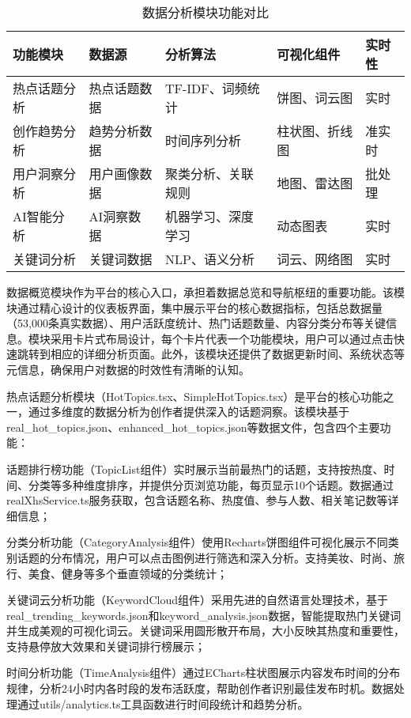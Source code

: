 \documentclass[12pt,a4paper]{article}
\begin{document}
\begin{table}[H]
\centering
\caption{数据分析模块功能对比}
\begin{tabular}{|p{2.2cm}|p{2.2cm}|p{2.8cm}|p{2.2cm}|p{1.8cm}|}
\hline
\textbf{功能模块} & \textbf{数据源} & \textbf{分析算法} & \textbf{可视化组件} & \textbf{实时性} \\
\hline
热点话题分析 & 热点话题数据 & TF-IDF、词频统计 & 饼图、词云图 & 实时 \\
\hline
创作趋势分析 & 趋势分析数据 & 时间序列分析 & 柱状图、折线图 & 准实时 \\
\hline
用户洞察分析 & 用户画像数据 & 聚类分析、关联规则 & 地图、雷达图 & 批处理 \\
\hline
AI智能分析 & AI洞察数据 & 机器学习、深度学习 & 动态图表 & 实时 \\
\hline
关键词分析 & 关键词数据 & NLP、语义分析 & 词云、网络图 & 实时 \\
\hline
\end{tabular}
\end{table}

数据概览模块作为平台的核心入口，承担着数据总览和导航枢纽的重要功能。该模块通过精心设计的仪表板界面，集中展示平台的核心数据指标，包括总数据量（53,000条真实数据）、用户活跃度统计、热门话题数量、内容分类分布等关键信息。模块采用卡片式布局设计，每个卡片代表一个功能模块，用户可以通过点击快速跳转到相应的详细分析页面。此外，该模块还提供了数据更新时间、系统状态等元信息，确保用户对数据的时效性有清晰的认知。

热点话题分析模块（HotTopics.tsx、SimpleHotTopics.tsx）是平台的核心功能之一，通过多维度的数据分析为创作者提供深入的话题洞察。该模块基于real\_hot\_topics.json、enhanced\_hot\_topics.json等数据文件，包含四个主要功能：

话题排行榜功能（TopicList组件）实时展示当前最热门的话题，支持按热度、时间、分类等多种维度排序，并提供分页浏览功能，每页显示10个话题。数据通过realXhsService.ts服务获取，包含话题名称、热度值、参与人数、相关笔记数等详细信息；

分类分析功能（CategoryAnalysis组件）使用Recharts饼图组件可视化展示不同类别话题的分布情况，用户可以点击图例进行筛选和深入分析。支持美妆、时尚、旅行、美食、健身等多个垂直领域的分类统计；

关键词云分析功能（KeywordCloud组件）采用先进的自然语言处理技术，基于real\_trending\_keywords.json和keyword\_analysis.json数据，智能提取热门关键词并生成美观的可视化词云。关键词采用圆形散开布局，大小反映其热度和重要性，支持悬停放大效果和关键词排行榜展示；

时间分析功能（TimeAnalysis组件）通过ECharts柱状图展示内容发布时间的分布规律，分析24小时内各时段的发布活跃度，帮助创作者识别最佳发布时机。数据处理通过utils/analytics.ts工具函数进行时间段统计和趋势分析。
\end{document}
